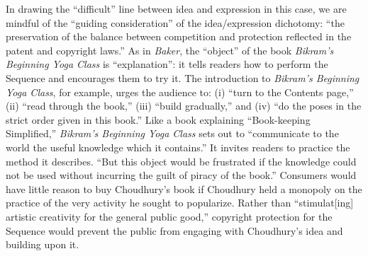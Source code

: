 In drawing the ``difficult'' line between idea and expression in this
case, we are mindful of the ``guiding consideration'' of the
idea/expression dichotomy: ``the preservation of the balance between
competition and protection reflected in the patent and copyright laws.''  As in
\textit{Baker}, the ``object'' of the book \textit{Bikram's Beginning Yoga
Class} is ``explanation'': it tells readers how to perform the Sequence and
encourages them to try it. The introduction to
\textit{Bikram's Beginning Yoga Class}, for example, urges the audience to: (i)
``turn to the Contents page,'' (ii) ``read  through the book,'' (iii) ``build
gradually,'' and (iv) ``do the poses in the strict order given in this book.''
Like a book explaining
``Book-keeping Simplified,'' \textit{Bikram's Beginning Yoga
Class} sets out to ``communicate to the world the useful knowledge which it
contains.''
It invites readers to practice the method it describes. ``But
this object would be frustrated if the knowledge could not be used
without incurring the guilt of piracy of the book.'' Consumers
would have little reason to buy Choudhury's book if Choudhury held a
monopoly on the practice of the very activity he sought to popularize.
Rather than ``stimulat[ing] artistic creativity for the general public
good,'' copyright protection for the Sequence would prevent the public
from engaging with Choudhury's idea and building upon it. 

